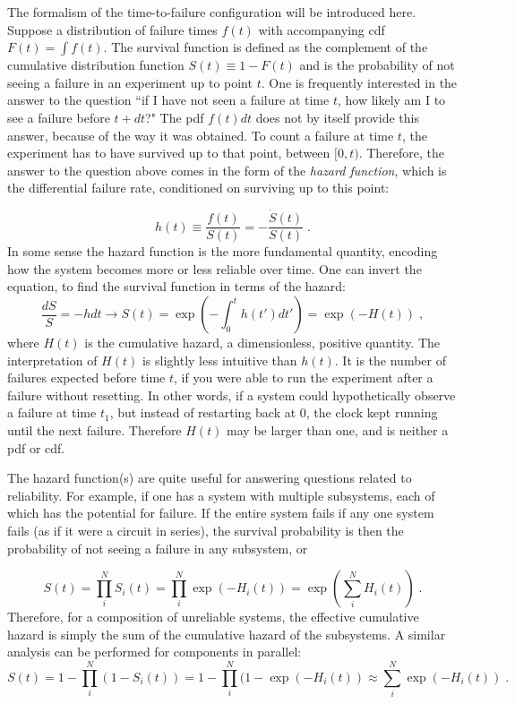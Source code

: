 The formalism of the time-to-failure configuration will be introduced here.
Suppose a distribution of failure times $f(t)$ with accompanying cdf $F(t)= \int f(t)$.
The survival function is defined as the complement of the cumulative distribution function $S(t)\equiv 1-F(t)$ and is the probability of not seeing a failure in an experiment up to point $t$.
One is frequently interested in the answer to the question ``if I have not seen a failure at time $t$, how likely am I to see a failure before $t+dt$?"
The pdf $f(t)dt$ does not by itself provide this answer, because of the way it was obtained.
To count a failure at time $t$, the experiment has to have survived up to that point, between $[0,t)$.
Therefore, the answer to the question above comes in the form of the \textit{hazard function}, which is the differential failure rate, conditioned on surviving up to this point:

\begin{equation}
    h(t)\equiv \frac{f(t)}{S(t)}= -\frac{\dot{S}(t)}{S(t)}\;.
    \label{eq:hazard_def}
\end{equation}
\noindent
In some sense the hazard function is the more fundamental quantity, encoding how the system becomes more or less reliable over time.
One can invert the equation, to find the survival function in terms of the hazard:
\begin{equation}
    \frac{dS}{S} = - h dt \rightarrow S(t) = \exp(-\int_0^t h(t') dt') =  \exp (-H(t))\;,
    \label{eq:cum_hazard_def}
\end{equation}
\noindent
where $H(t)$ is the cumulative hazard, a dimensionless, positive quantity.
The interpretation of $H(t)$ is slightly less intuitive than $h(t)$.
It is the number of failures expected before time $t$, if you were able to run the experiment after a failure without resetting.
In other words, if a system could hypothetically observe a failure at time $t_1$, but instead of restarting back at 0, the clock kept running until the next failure.
Therefore $H(t)$ may be larger than one, and is neither a pdf or cdf.

The hazard function(s) are quite useful for answering questions related to reliability.
For example, if one has a system with multiple subsystems, each of which has the potential for failure.
If the entire system fails if any one system fails (as if it were a circuit in series), the survival probability is then the probability of not seeing a failure in any subsystem, or 

\begin{equation}
    S(t) = \prod_i^N S_i(t) = \prod_i^N \exp (-H_i(t)) = \exp( \sum_i^N H_i(t))\;.
\end{equation}
\noindent
Therefore, for a composition of unreliable systems, the effective cumulative hazard is simply the sum of the cumulative hazard of the subsystems.
A similar analysis can be performed for components in parallel:
\begin{equation}
    S(t) = 1-\prod_i^N(1- S_i(t)) = 1-  \prod_i^N (1- \exp (-H_i(t)) \approx \sum_i^N\exp (-H_i(t))\;.
\end{equation}

